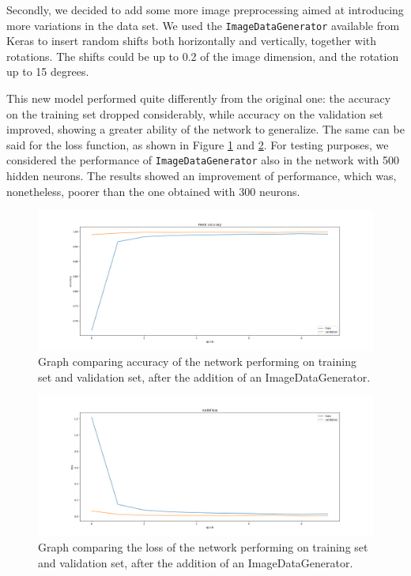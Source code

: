 Secondly, we decided to add some more image preprocessing aimed at introducing more variations in the data set. We used the \texttt{ImageDataGenerator} available from Keras to insert random shifts both horizontally and vertically, together with rotations. The shifts could be up to 0.2 of the image dimension, and the rotation up to 15 degrees.

This new model performed quite differently from the original one: the accuracy on the training set dropped considerably, while accuracy on the validation set improved, showing a greater ability of the network to generalize. The same can be said for the loss function, as shown in Figure \ref{fig5-300dig-acc_5} and \ref{fig6-300dig-loss_5}. For testing purposes, we considered the performance of \texttt{ImageDataGenerator} also in the network with 500 hidden neurons. The results showed an improvement of performance, which was, nonetheless, poorer than the one obtained with 300 neurons.

\begin{figure}
	\centering
	\begin{minipage}{0.9\textwidth}
		\centering
		\includegraphics[width=1\textwidth]{300dig-acc_5.png}
	\end{minipage}
	\caption{Graph comparing accuracy of the network performing on training set and validation set, after the addition of an ImageDataGenerator.}
	\label{fig5-300dig-acc_5}
\end{figure}
\begin{figure}
	\centering
	\begin{minipage}{0.9\textwidth}
		\centering
		\includegraphics[width=1\textwidth]{300dig-loss_5.png} 
	\end{minipage}
	\caption{Graph comparing the loss of the network performing on training set and validation set, after the addition of an ImageDataGenerator.}
	\label{fig6-300dig-loss_5}
\end{figure}

